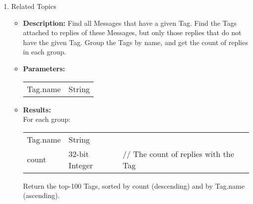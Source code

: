 {\begin{enumerate}
      \item Related Topics
            \begin{itemize}
                \item \textbf{Description:}
                  Find all Messages that have a given Tag.
                  Find the Tags attached to replies of these Messages, but only those replies that do not have the given
                  Tag. Group the Tags by name, and get the count of replies in each group.
                \item \textbf{Parameters:} \\
                    \begin{tabular}{ll}
                      Tag.name & String \\
                    \end{tabular}
                \item \textbf{Results:} \\
                  For each group:
                    \begin{tabular}{lll}
                      Tag.name & String & \\
                      count & 32-bit Integer & \parbox[t]{20cm}{ // The count of replies with the Tag \strut} \\
                    \end{tabular}
                    Return the top-100 Tags, sorted by count (descending) and by Tag.name (ascending).
                    \end{itemize}


\end{enumerate}}
